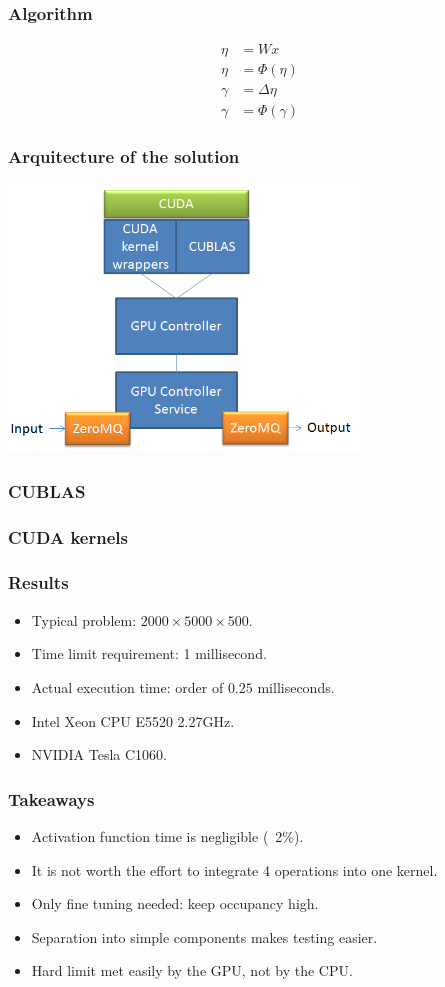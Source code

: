 \begin{frame}
\frametitle{Algorithm}
\begin{align}
\eta &= Wx \\
\eta &= \Phi(\eta) \\
\gamma &= \Delta\eta \\
\gamma &= \Phi(\gamma)
\end{align}
\end{frame}


\begin{frame}
\frametitle{Arquitecture of the solution}
\includegraphics[width=0.7\textwidth]{arq}
\end{frame}


\begin{frame}
      \frametitle{CUBLAS}
      
\end{frame}

\begin{frame}
      \frametitle{CUDA kernels}
      
\end{frame}

\begin{frame}
      \frametitle{Results}
\begin{itemize}
\item Typical problem: \(2000\times5000\times 500\).
\item Time limit requirement: 1 millisecond.
\item Actual execution time: order of \(0.25\) milliseconds.
\item Intel Xeon CPU E5520 2.27GHz.
\item NVIDIA Tesla C1060.
\end{itemize}
\end{frame}

\begin{frame}
      \frametitle{Takeaways}
\begin{itemize}
\item Activation function time is negligible (~2\%).
\item It is not worth the effort to integrate 4 operations into one kernel.
\item Only fine tuning needed: keep occupancy high.
\item Separation into simple components makes testing easier.
\item Hard limit met easily by the GPU, not by the CPU.
\end{itemize}
\end{frame}



